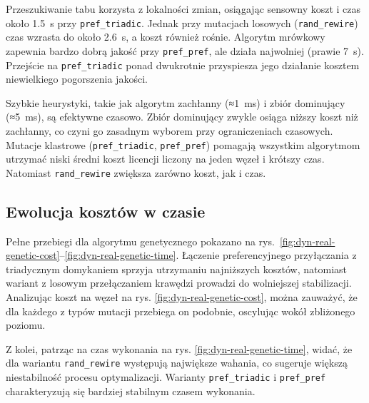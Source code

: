 Przeszukiwanie tabu korzysta z lokalności zmian, osiągając sensowny koszt i czas około \SI{1.5}{\second} przy \texttt{pref\_triadic}. Jednak przy mutacjach losowych (\texttt{rand\_rewire}) czas wzrasta do około \SI{2.6}{\second}, a koszt również rośnie. Algorytm mrówkowy zapewnia bardzo dobrą jakość przy \texttt{pref\_pref}, ale działa najwolniej (prawie \SI{7}{\second}). Przejście na \texttt{pref\_triadic} ponad dwukrotnie przyspiesza jego działanie kosztem niewielkiego pogorszenia jakości.

Szybkie heurystyki, takie jak algorytm zachłanny (≈\SI{1}{\milli\second}) i zbiór dominujący (≈\SI{5}{\milli\second}), są efektywne czasowo. Zbiór dominujący zwykle osiąga niższy koszt niż zachłanny, co czyni go zasadnym wyborem przy ograniczeniach czasowych. Mutacje klastrowe (\texttt{pref\_triadic}, \texttt{pref\_pref}) pomagają wszystkim algorytmom utrzymać niski średni koszt licencji liczony na jeden węzeł i krótszy czas. Natomiast \texttt{rand\_rewire} zwiększa zarówno koszt, jak i czas.


\subsection{Ewolucja kosztów w czasie}
Pełne przebiegi dla algorytmu genetycznego pokazano na rys.~\ref{fig:dyn-real-genetic-cost}--\ref{fig:dyn-real-genetic-time}. Łączenie preferencyjnego przyłączania z triadycznym domykaniem sprzyja utrzymaniu najniższych kosztów, natomiast wariant z losowym przełączaniem krawędzi prowadzi do wolniejszej stabilizacji. Analizując koszt na węzeł na rys. \ref{fig:dyn-real-genetic-cost}, można zauważyć, że dla każdego z typów mutacji przebiega on podobnie, oscylując wokół zbliżonego poziomu.

Z kolei, patrząc na czas wykonania na rys. \ref{fig:dyn-real-genetic-time}, widać, że dla wariantu \texttt{rand\_rewire} występują największe wahania, co sugeruje większą niestabilność procesu optymalizacji. Warianty \texttt{pref\_triadic} i \texttt{pref\_pref} charakteryzują się bardziej stabilnym czasem wykonania.

